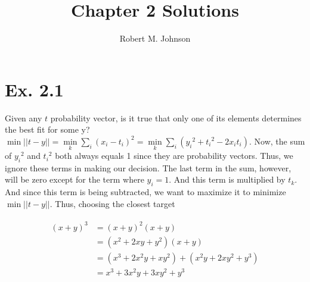 \documentclass{article}
\title{Chapter 2 Solutions}
\date{\vspace{-5ex}}
\author{Robert M. Johnson}
\begin{document}
\maketitle



\section*{Ex. 2.1}
Given any $t$ probability vector, is it true that only one of its elements determines the best fit for some y? $ \min || t - y ||  =  \min\limits_{k} \sum\limits_{i} (x_i - t_i)^2 = \min\limits_{k} \sum\limits_{i} ({y_i}^2 + {t_i}^2 - 2x_it_i) $. Now, the sum of ${y_i}^2$ and ${t_i}^2$ both always equals 1 since they are probability vectors. Thus, we ignore these terms in making our decision. The last term in the sum, however, will be zero except for the term where $y_i = 1$. And this term is multiplied by $ t_k$. And since this term is being subtracted, we want to maximize it to minimize $ \min || t - y ||$. Thus, choosing the closest target

\begin{align} 
\begin{split}
(x+y)^3 	&= (x+y)^2(x+y)\\
&=(x^2+2xy+y^2)(x+y)\\
&=(x^3+2x^2y+xy^2) + (x^2y+2xy^2+y^3)\\
&=x^3+3x^2y+3xy^2+y^3
\end{split}					
\end{align}
\end{document}
